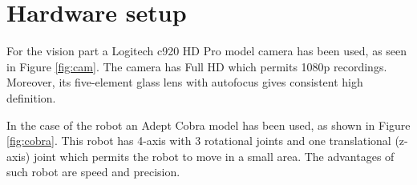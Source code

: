 \chapter{Hardware setup}\label{ch:hardware}

For the vision part a Logitech c920 HD Pro model camera has been used, as seen in Figure \ref{fig:cam}. The camera has Full HD which permits 1080p recordings. Moreover, its five-element glass lens with autofocus gives consistent high definition.

In the case of the robot an Adept Cobra model has been used, as shown in Figure \ref{fig:cobra}. This robot has 4-axis with 3 rotational joints and one translational (z-axis) joint which permits the robot to move in a small area. The advantages of such robot are speed and precision. 

\begin{figure}[H]
	\hfill
	\hfill
\end{figure}
